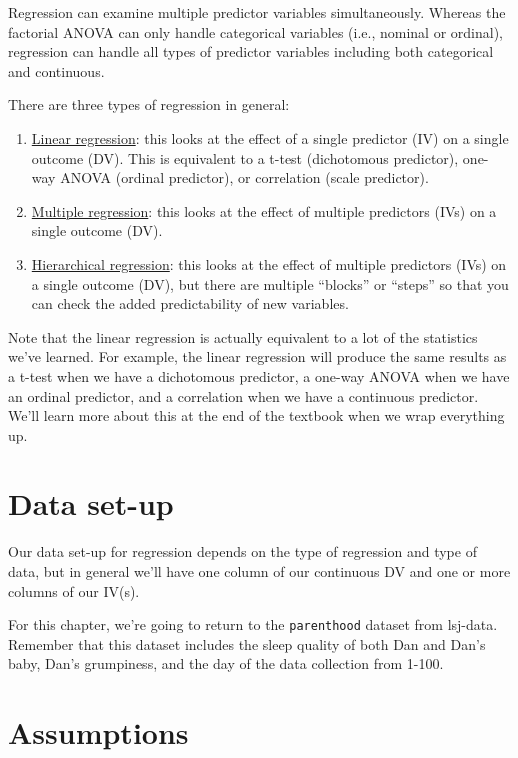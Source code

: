 \documentclass[
]{book}
\begin{document}
Regression can examine multiple predictor variables simultaneously. Whereas the factorial ANOVA can only handle categorical variables (i.e., nominal or ordinal), regression can handle all types of predictor variables including both categorical and continuous.

There are three types of regression in general:

\begin{enumerate}
\def\labelenumi{\arabic{enumi}.}
\item
  \underline{Linear regression}: this looks at the effect of a single predictor (IV) on a single outcome (DV). This is equivalent to a t-test (dichotomous predictor), one-way ANOVA (ordinal predictor), or correlation (scale predictor).
\item
  \underline{Multiple regression}: this looks at the effect of multiple predictors (IVs) on a single outcome (DV).
\item
  \underline{Hierarchical regression}: this looks at the effect of multiple predictors (IVs) on a single outcome (DV), but there are multiple ``blocks'' or ``steps'' so that you can check the added predictability of new variables.
\end{enumerate}

Note that the linear regression is actually equivalent to a lot of the statistics we've learned. For example, the linear regression will produce the same results as a t-test when we have a dichotomous predictor, a one-way ANOVA when we have an ordinal predictor, and a correlation when we have a continuous predictor. We'll learn more about this at the end of the textbook when we wrap everything up.

\hypertarget{data-set-up-8}{%
\section{Data set-up}\label{data-set-up-8}}

Our data set-up for regression depends on the type of regression and type of data, but in general we'll have one column of our continuous DV and one or more columns of our IV(s).

For this chapter, we're going to return to the \texttt{parenthood} dataset from lsj-data. Remember that this dataset includes the sleep quality of both Dan and Dan's baby, Dan's grumpiness, and the day of the data collection from 1-100.

\hypertarget{assumptions-4}{%
\section{Assumptions}\label{assumptions-4}}
\end{document}
